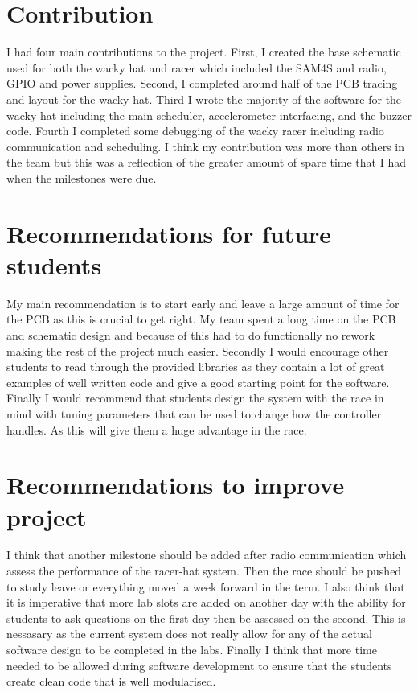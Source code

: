 \documentclass[a4paper,12pt]{article}
\begin{document}
\section{Contribution}

I had four main contributions to the project. First, I created the base schematic used for both the wacky hat and racer which included the SAM4S and radio, GPIO and power supplies. Second, I completed around half of the PCB tracing and layout for the wacky hat. Third I wrote the majority of the software for the wacky hat including the main scheduler, accelerometer interfacing, and the buzzer code. Fourth I completed some debugging of the wacky racer including radio communication and scheduling. I think my contribution was more than others in the team but this was a reflection of the greater amount of spare time that I had when the milestones were due.


\section{Recommendations for future students}

My main recommendation is to start early and leave a large amount of time for the PCB as this is crucial to get right. My team spent a long time on the PCB and schematic design and because of this had to do functionally no rework making the rest of the project much easier. Secondly I would encourage other students to read through the provided libraries as they contain a lot of great examples of well written code and give a good starting point for the software. Finally I would recommend that students design the system with the race in mind with tuning parameters that can be used to change how the controller handles. As this will give them a huge advantage in the race.

\section{Recommendations to improve project}

I think that another milestone should be added after radio communication which assess the performance of the racer-hat system. Then the race should be pushed to study leave or everything moved a week forward in the term. I also think that it is imperative that more lab slots are added on another day with the ability for students to ask questions on the first day then be assessed on the second. This is nessasary as the current system does not really allow for any of the actual software design to be completed in the labs. Finally I think that more time needed to be allowed during software development to ensure that the students create clean code that is well modularised. 
\end{document}
